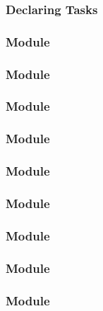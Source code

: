 \documentclass[t, notes, xcolor=table]{beamer}
\begin{document}
\begin{frame}
\frametitle{Declaring Tasks}

\end{frame}

\begin{frame}
\frametitle{Module}

\end{frame}

\begin{frame}
\frametitle{Module}

\end{frame}

\begin{frame}
\frametitle{Module}

\end{frame}

\begin{frame}
\frametitle{Module}

\end{frame}

\begin{frame}
\frametitle{Module}

\end{frame}

\begin{frame}
\frametitle{Module}

\end{frame}

\begin{frame}
\frametitle{Module}

\end{frame}

\begin{frame}
\frametitle{Module}

\end{frame}

\begin{frame}
\frametitle{Module}

\end{frame}
\end{document}
